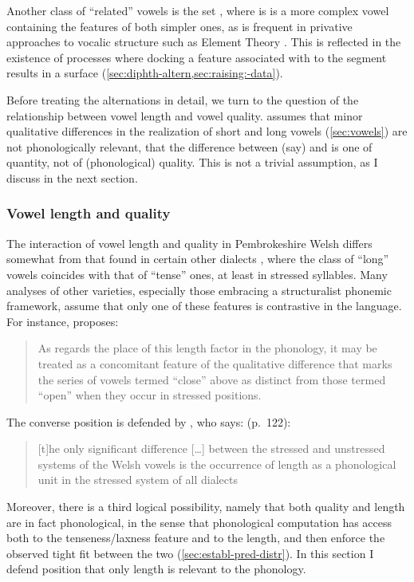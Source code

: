 Another class of \enquote{related} vowels is the set \ipa{[a~e~i]}, where is \ipa{[e]} is a more complex vowel containing the features of both simpler ones, as is frequent in privative approaches to vocalic structure such as Element Theory \citep{harris95,harris05:_vowel_reduction,backley11:_elemen_theor}. This is reflected in the existence of processes where docking a feature associated with \ipa{[i]} to the segment \ipa{[a]} results in a surface \ipa{[e]} (\cref{sec:diphth-altern,sec:raising:-data}).

Before treating the alternations in detail, we turn to the question of the relationship between vowel length and vowel quality.  assumes that minor qualitative differences in the realization of short and long vowels (\cref{sec:vowels}) are not phonologically relevant, \ie that the difference between (say)  and  is one of quantity, not of (phonological) quality. This is not a trivial assumption, as I discuss in the next section.

\subsubsection{Vowel length and quality}
\label{sec:vowel-length-quality}

The interaction of vowel length and quality in Pembrokeshire Welsh differs somewhat from that found in certain other dialects \citep{watkins61:_ieith,jones}, where the class of \enquote{long} vowels coincides with that of \enquote{tense} ones, at least in stressed syllables. Many analyses of other varieties, especially those embracing a structuralist phonemic framework, assume that only one of these features is contrastive in the language. For instance, \citet[p.~53]{jones} proposes: \blockquote{As regards the place of this length factor in the phonology, it may be treated as a concomitant feature of the qualitative difference that marks the series of vowels termed \enquote{close} above as distinct from those termed \enquote{open} when they occur in stressed positions.} The converse position is defended by \citet{thomas66:_system_welsh}, who says: (p.~122): \blockquote{[t]he only significant difference [\ldots] between the stressed and unstressed systems of the Welsh vowels is the occurrence of length as a phonological unit in the stressed system of all dialects}. Moreover, there is a third logical possibility, namely that both quality and length are in fact phonological, in the sense that phonological computation has access both to the tenseness\fshyp laxness feature and to the length, and then enforce the observed tight fit between the two (\cref{sec:establ-pred-distr}). In this section I defend  position that only length is relevant to the phonology.

